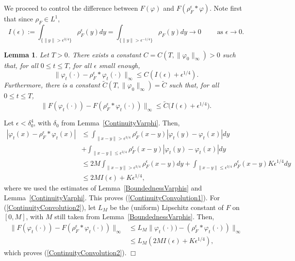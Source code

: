 \documentclass[12pt]{article}
\newenvironment {proof}{{\noindent\bf Proof }}{\hfill $\Box$ \medskip}
\newtheorem{lemma}[theorem]{Lemma}
\numberwithin{equation}{section}
\begin{document}
We proceed to control the difference between $F(\varphi)$ and 
$F(\rho^\epsilon_F*\varphi)$. 
Note first that since $\rho_F\in L^1$, 
\[
I(\epsilon):=\int_{\{\|y\|>\epsilon^{3/4}\}}\rho^\epsilon_F(y)dy
=\int_{\{\|y\|>\epsilon^{-1/4}\}}\rho_F(y)dy
\to 0\qquad\mbox{ as }
\epsilon\to 0.
\]

\begin{lemma} 
\label{ContinuityConvolution}
Let $T>0$. There exists a constant 
$C=C(T,\| \varphi_0 \|_\infty)>0$ such that, for all $0 \leq t \leq T$, 
for all $\epsilon$ small enough,
\begin{equation} 
\label{ContinuityConvolution1} 
\| \varphi_t(\cdot) - \rho^\epsilon_F*\varphi_t(\cdot) \|_\infty 
\leq C (I(\epsilon)+\epsilon^{1/4}). 
\end{equation}
Furthermore, there is a constant $\widetilde{C}(T, \| \varphi_0 \|_\infty) = \widetilde{C}$
such that, for all $0 \leq t \leq T$,
\begin{equation} 
\label{ContinuityConvolution2} 
\| F(\varphi_t(\cdot)) - F(\rho^\epsilon_F*\varphi_t(\cdot)) \|_\infty 
\leq \widetilde{C}\big(I(\epsilon)+\epsilon^{1/4}\big). 
\end{equation}
\end{lemma}
\begin{proof}
Let $\epsilon<\delta_0^4$, with $\delta_0$ from Lemma~\ref{ContinuityVarphi}. Then,
\begin{align*}
|\varphi_t(x) - \rho^\epsilon_F*\varphi_t(x)| & \leq 
\int_{\|x-y\| > \epsilon^{3/4} } \rho^\epsilon_F(x-y)|\varphi_t(y)-\varphi_t(x)| dy  \\ 
& + \int_{\|x-y\| \leq \epsilon^{3/4} } \rho^\epsilon_F(x-y)|\varphi_t(y)-\varphi_t(x)| dy \\ 
& \leq 2 M \int_{\|x-y\| > \epsilon^{3/4}  } \rho^\epsilon_F(x-y) dy 
+ \int_{\|x-y\| \leq \epsilon^{3/4}} \rho^\epsilon_F(x-y) K \epsilon^{1/4} dy \\
&\leq 2M I(\epsilon) + K \epsilon^{1/4},
\end{align*}
where we used 
the estimates of Lemma~\ref{BoundednessVarphis}
and Lemma~\ref{ContinuityVarphi}.
This proves (\ref{ContinuityConvolution1}). For (\ref{ContinuityConvolution2}),
let $L_M$ be the (uniform) Lipschitz constant of $F$ on $[0,M]$, with
$M$ still taken from Lemma~\ref{BoundednessVarphis}. Then,
\begin{align*}
 \| F(\varphi_t(\cdot)) - F(\rho^\epsilon_F*\varphi_t(\cdot)) \|_\infty 
&\leq L_M \| \varphi_t(\cdot)) - (\rho^\epsilon_F*\varphi_t(\cdot)) \|_\infty \\ 
& \leq L_M ( 2 M I(\epsilon) + K\epsilon^{1/4}),
\end{align*}
which proves (\ref{ContinuityConvolution2}). 
\end{proof}
\end{document}
